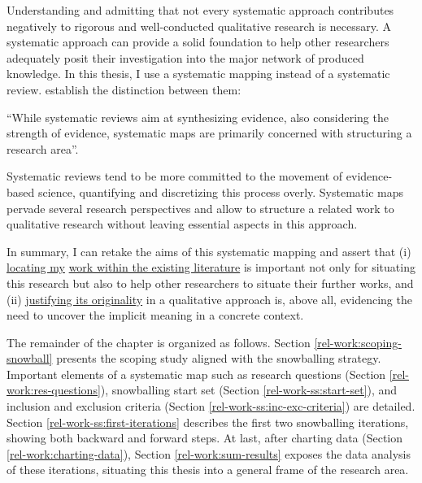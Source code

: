 Understanding and admitting that not every systematic approach contributes negatively to rigorous and well-conducted qualitative research is necessary. A systematic approach can provide a solid foundation to help other researchers adequately posit their investigation into the major network of produced knowledge. In this thesis, I use a systematic mapping instead of a systematic review.  establish the distinction between them:
\begin{citacao}
    “While systematic reviews aim at synthesizing evidence, also considering the strength of evidence, systematic maps are primarily concerned with structuring a research area”.    
\end{citacao}

Systematic reviews tend to be more committed to the movement of evidence-based science, quantifying and discretizing this process overly. Systematic maps pervade several research perspectives and allow to structure a related work to qualitative research without leaving essential aspects in this approach.

In summary, I can retake the aims of this systematic mapping and assert that (i) \underline{locating my} \underline{work within the existing literature} is important not only for situating this research but also to help other researchers to situate their further works, and (ii) \underline{justifying its originality} in a qualitative approach is, above all, evidencing the need to uncover the implicit meaning in a concrete context. 

The remainder of the chapter is organized as follows. Section \ref{rel-work:scoping-snowball} presents the scoping study aligned with the snowballing strategy. Important elements of a systematic map such as research questions (Section \ref{rel-work:res-questions}), snowballing start set (Section \ref{rel-work-ss:start-set}), and inclusion and exclusion criteria (Section \ref{rel-work-ss:inc-exc-criteria}) are detailed. Section \ref{rel-work-ss:first-iterations} describes the first two snowballing iterations, showing both backward and forward steps. At last, after charting data (Section \ref{rel-work:charting-data}), Section \ref{rel-work:sum-results} exposes the data analysis of these iterations, situating this thesis into a general frame of the research area.
